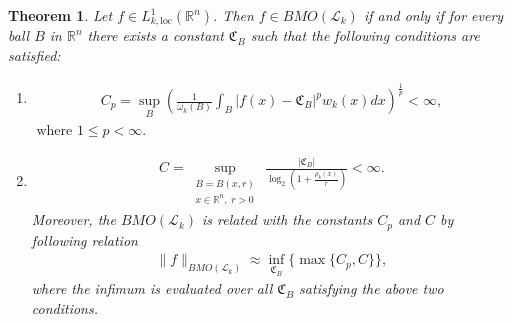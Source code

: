 \documentclass[11pt, reqno]{amsproc}
\newtheorem{theorem}{Theorem}[section]
\theoremstyle{definition}
\theoremstyle{remark}
\numberwithin{equation}{section}
\begin{document}
\begin{theorem}
    Let $f\in L_{k,\mathrm{loc}}^{1}(\mathbb{R}^n)$. Then $f\in BMO(\mathcal{L}_k)$  if and only if for every ball $B$ in $\mathbb{R}^n$ there exists a constant $\mathfrak{C}_B$ such that the following conditions are satisfied:
    \begin{enumerate}[$(i)$]
     \item 
    \begin{align*}
        C_p = \sup\limits_{B} \left(  \frac{1}{\omega_k(B)} \int_{B}|f(x)-\mathfrak{C}_B|^pw_k(x)dx \right)^{\frac{1}{p}} <\infty,  
    \end{align*}$\text{ where  } 1\leq p< \infty.$
    \item 
    \begin{align*}
C
= \sup_{\substack{B = B(x,r) \\ x \in \mathbb{R}^n,\; r > 0}}
\,\frac{|\mathfrak{C}_B|}{\log_2\!\left(1 + \frac{{\rho_k}(x)}{r}\right)} < \infty.
\end{align*} Moreover, the $BMO(\mathcal{L}_k)$ is related with the constants $C_p$ and $C$ by following relation
\begin{align*}
    \|f\|_{BMO(\mathcal{L}_k)} \approx \inf\limits_{\mathfrak{C}_B} \{\max\{C_p,C \}\},
\end{align*} where the infimum is evaluated over all  $\mathfrak{C}_B$ satisfying the above two conditions. 
    \end{enumerate}
\end{theorem} 
\end{document}

